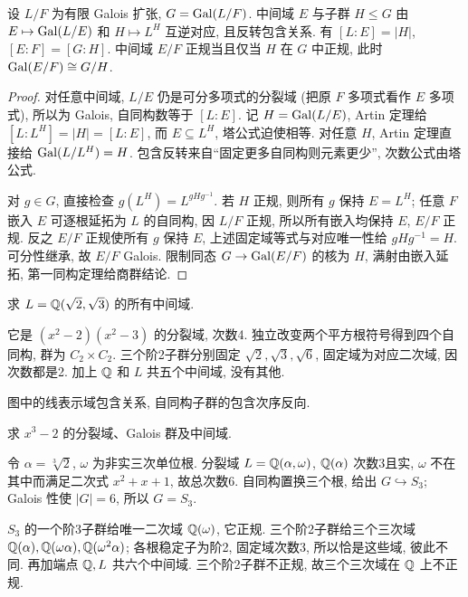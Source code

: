 \begin{theorem}[有限 Galois 对应]\label{thm:galois}
设 $L/F$ 为有限 Galois 扩张, $G=\operatorname{Gal}(L/F)$. 中间域 $E$ 与子群 $H\le G$ 由
$E\mapsto\operatorname{Gal}(L/E)$ 和 $H\mapsto L^H$ 互逆对应, 且反转包含关系. 有 $[L:E]=|H|$, $[E:F]=[G:H]$. 中间域 $E/F$ 正规当且仅当 $H$ 在 $G$ 中正规, 此时 $\operatorname{Gal}(E/F)\cong G/H$.
\end{theorem}
\begin{proof}
对任意中间域, $L/E$ 仍是可分多项式的分裂域 (把原 $F$ 多项式看作 $E$ 多项式), 所以为 Galois, 自同构数等于 $[L:E]$. 记 $H=\operatorname{Gal}(L/E)$, Artin 定理给 $[L:L^H]=|H|=[L:E]$, 而 $E\subseteq L^H$, 塔公式迫使相等. 对任意 $H$, Artin 定理直接给 $\operatorname{Gal}(L/L^H)=H$. 包含反转来自“固定更多自同构则元素更少”, 次数公式由塔公式.

对 $g\in G$, 直接检查 $g(L^H)=L^{gHg^{-1}}$. 若 $H$ 正规, 则所有 $g$ 保持 $E=L^H$; 任意 $F$ 嵌入 $E$ 可逐根延拓为 $L$ 的自同构, 因 $L/F$ 正规, 所以所有嵌入均保持 $E$, $E/F$ 正规. 反之 $E/F$ 正规使所有 $g$ 保持 $E$, 上述固定域等式与对应唯一性给 $gHg^{-1}=H$. 可分性继承, 故 $E/F$ Galois. 限制同态 $G\to\operatorname{Gal}(E/F)$ 的核为 $H$, 满射由嵌入延拓, 第一同构定理给商群结论.
\end{proof}
\begin{example}求 $L=\mathbb Q(\sqrt2,\sqrt3)$ 的所有中间域.\end{example}
\begin{solution}
它是 $(x^2-2)(x^2-3)$ 的分裂域, 次数4. 独立改变两个平方根符号得到四个自同构, 群为 $C_2\times C_2$. 三个阶2子群分别固定 $\sqrt2,\sqrt3,\sqrt6$, 固定域为对应二次域, 因次数都是2. 加上 $\mathbb Q$ 和 $L$ 共五个中间域, 没有其他.
\begin{center}
\end{center}
图中的线表示域包含关系, 自同构子群的包含次序反向.
\end{solution}
\begin{example}求 $x^3-2$ 的分裂域、Galois 群及中间域.\end{example}
\begin{solution}
令 $\alpha=\sqrt[3]2$, $\omega$ 为非实三次单位根. 分裂域 $L=\mathbb Q(\alpha,\omega)$, $\mathbb Q(\alpha)$ 次数3且实, $\omega$ 不在其中而满足二次式 $x^2+x+1$, 故总次数6. 自同构置换三个根, 给出 $G\hookrightarrow S_3$; Galois 性使 $|G|=6$, 所以 $G=S_3$.

$S_3$ 的一个阶3子群给唯一二次域 $\mathbb Q(\omega)$, 它正规. 三个阶2子群给三个三次域 $\mathbb Q(\alpha),\mathbb Q(\omega\alpha),\mathbb Q(\omega^2\alpha)$; 各根稳定子为阶2, 固定域次数3, 所以恰是这些域, 彼此不同. 再加端点 $\mathbb Q,L$ 共六个中间域. 三个阶2子群不正规, 故三个三次域在 $\mathbb Q$ 上不正规.
\end{solution}
